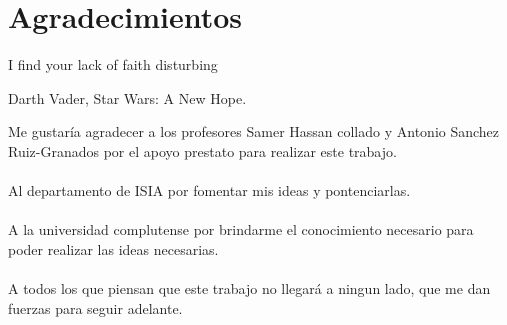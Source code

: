%
%
%
%
%
%
%
%
%
%
%
%
%

\chapter{Agradecimientos}

\begin{FraseCelebre}
\begin{Frase}
I find your lack of faith disturbing\end{Frase}
\begin{Fuente}
Darth Vader, Star Wars: A New Hope.
\end{Fuente}
\end{FraseCelebre}

Me gustaría agradecer a los profesores Samer Hassan collado y Antonio Sanchez Ruiz-Granados
por el apoyo prestato para realizar este trabajo. 
\\
\mbox{}
\\
Al departamento de ISIA por fomentar mis ideas y pontenciarlas.
\\
\mbox{}
\\
A la universidad complutense por brindarme el conocimiento necesario para poder
realizar las ideas necesarias.
\\
\mbox{}
\\
A todos los que piensan que este trabajo no llegará a ningun lado, que me dan
fuerzas para seguir adelante.
\endinput
